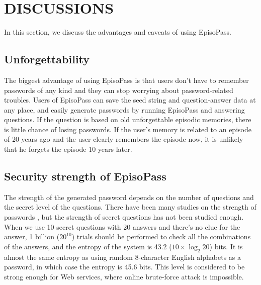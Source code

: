 \documentclass[runningheads,a4paper]{llncs}
\begin{document}
\section{DISCUSSIONS}

In this section, we discuss the advantages and caveats of
using EpisoPass.

\subsection{Unforgettability}

The biggest advantage of using EpisoPass is that
users don't have to remember passwords of any kind and
they can stop worrying about password-related troubles.
%
Users of EpisoPass can save the seed string and question-answer data
at any place, and easily generate passwords by running
EpisoPass and answering questions.
If the question is based on old unforgettable episodic memories,
there is little chance of losing passwords.
If the user's memory is related to an episode of 20 years ago and the user clearly
remembers the episode now, it is unlikely that he forgets the episode 10 years later.

\subsection{Security strength of EpisoPass}

The strength of the generated password depends on the number of
questions and the secret level of the questions.
%
There have been many studies on the strength of passwords
\cite{Hayashi:2011:DSP:1978942.1979326}%
\cite{Komanduri:2011:PPM:1978942.1979321}, %
but the strength of secret questions has not been studied enough.
%
%
When we use 10 secret questions with 20 answers and
there's no clue for the answer,
1 billion ($20^{10}$) trials should be performed to check
all the combinations of the answers,
and the entropy of the system is 43.2 ($10 \times \log_2 20$) bits.  %
%
%
It is almost the same entropy as using random 8-character English alphabets
as a password, in which case the entropy is 45.6 bits.
This level is considered to be strong enough for Web services,
where online brute-force attack is impossible\cite{Florencio:2007:SWP:1361419.1361429}.
\end{document}
